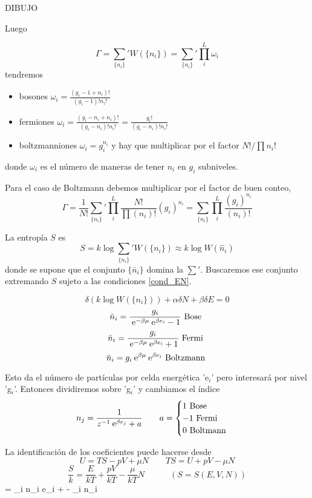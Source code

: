 \documentclass[10pt,oneside]{CBFT_book}
\begin{document}
DIBUJO

Luego

\[
	\Gamma = \sum_{ \{ n_i \} }' W(\{ n_i \}) = \sum_{ \{ n_i \} }' \prod_i^L  \omega_i 
\]
tendremos
\begin{itemize}
 \item bosones $ \omega_i = \frac{ ( g_i - 1 + n_i)! }{ (g_i - 1)!n_i!} $
 \item fermiones $ \omega_i = \frac{ ( g_i - n_i + n_i )! }{ (g_i - n_i)!n_i!} =
		\frac{ g_i! }{ (g_i -n_i )! n_i!}$
 \item boltzmanniones $ \omega_i = g_i^{n_i} $ y hay que multiplicar por el factor
		$ N! / \prod n_i! $
\end{itemize}
donde $ \omega_i $ es el número de maneras de tener $ n_i $ en $ g_i $ subniveles.

Para el caso de Boltzmann debemos multiplicar por el factor de buen conteo,
\[
	\Gamma = \frac{1}{N!} \sum_{ \{ n_i \} }' \prod_i^L \frac{N!}{\prod (n_i)!}(g_i)^{n_i}
	= \sum_{ \{ n_i \} } \prod_i^L \frac{ (g_i)^{n_i} }{ (n_i)! }
\]

La entropía $S$ es
\[
	S = k \log \sum_{ \{ n_i \} }' W ( \{ n_i \} ) \approx k \log W( \hat{n}_i )
\]
donde se supone que el conjunto $ \{ \bar{n}_i \}$ domina la $ \sum' $. Buscaremos ese conjunto
extremando $S$ sujeto a las condiciones \eqref{cond_EN}.

\[
	\delta ( k\log W( \{ n_i \} ) ) + \alpha \delta N + \beta \delta E = 0
\]
\[
	\bar{n}_i = \frac{ g_i }{ \:\mathrm{e}^{ -\beta \mu } \:\mathrm{e}^{ \beta e_i } - 1 } \text{ Bose }
\]
\[
	\bar{n}_i = \frac{ g_i }{ \:\mathrm{e}^{ -\beta \mu } \:\mathrm{e}^{ \beta e_i } + 1 } \text{ Fermi }
\]
\[
	\bar{n}_i =  g_i \:\mathrm{e}^{ \beta \mu } \:\mathrm{e}^{ \beta e_i } \text{ Boltzmann }
\]

Esto da el número de partículas por celda energética 'e$_i$' pero interesará por nivel 'g$_i$'.
Entonces dividiremos sobre 'g$_i$' y cambiamos el índice 
\[
	n_j = \frac{1}{z^{-1}\:\mathrm{e}^{\beta e_j} + a} \qquad 
	a = \begin{cases}
	 1 \text{ Bose } \\
	 -1 \text{ Fermi } \\
	 0 \text{ Boltmann }
	\end{cases}
\]

La identificación de los coeficientes puede hacerse desde 
\[
	U = TS - pV + \mu N \qquad TS = U  + pV - \mu N
\]
\[
	\frac{S}{k} = \frac{E}{kT} + \frac{pV}{kT} - \frac{\mu}{kT}N \qquad 
	\quad (S=S(E,V,N))
\]
\be
	 =  \sum_i n_i e_i +  -  \sum_i n_i
	\label{entropiaSoverk}
\ee
\end{document}
